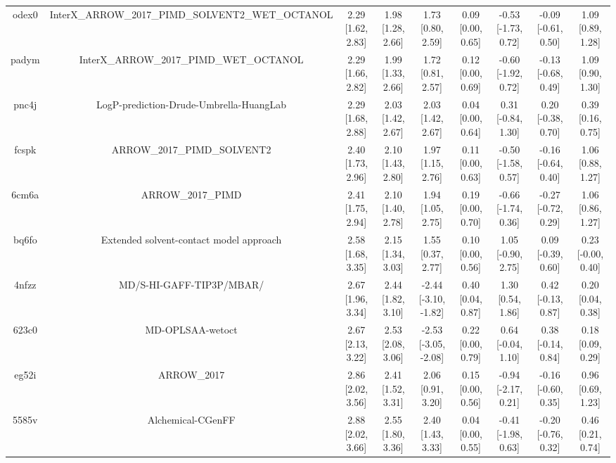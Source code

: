 \documentclass{article}
\begin{document}
\begin{center}
\begin{longtable}{|ccccccccc|}
 odex0 &  InterX\_ARROW\_2017\_PIMD\_SOLVENT2\_WET\_OCTANOL &  2.29 [1.62, 2.83] &  1.98 [1.28, 2.66] &     1.73 [0.80, 2.59] &  0.09 [0.00, 0.65] &  -0.53 [-1.73, 0.72] &  -0.09 [-0.61, 0.50] &     1.09 [0.89, 1.28] \\
 padym &            InterX\_ARROW\_2017\_PIMD\_WET\_OCTANOL &  2.29 [1.66, 2.82] &  1.99 [1.33, 2.66] &     1.72 [0.81, 2.57] &  0.12 [0.00, 0.69] &  -0.60 [-1.92, 0.72] &  -0.13 [-0.68, 0.49] &     1.09 [0.90, 1.30] \\
 pnc4j &            LogP-prediction-Drude-Umbrella-HuangLab &  2.29 [1.68, 2.88] &  2.03 [1.42, 2.67] &     2.03 [1.42, 2.67] &  0.04 [0.00, 0.64] &   0.31 [-0.84, 1.30] &   0.20 [-0.38, 0.70] &     0.39 [0.16, 0.75] \\
 fcspk &                        ARROW\_2017\_PIMD\_SOLVENT2 &  2.40 [1.73, 2.96] &  2.10 [1.43, 2.80] &     1.97 [1.15, 2.76] &  0.11 [0.00, 0.63] &  -0.50 [-1.58, 0.57] &  -0.16 [-0.64, 0.40] &     1.06 [0.88, 1.27] \\
 6cm6a &                                  ARROW\_2017\_PIMD &  2.41 [1.75, 2.94] &  2.10 [1.40, 2.78] &     1.94 [1.05, 2.75] &  0.19 [0.00, 0.70] &  -0.66 [-1.74, 0.36] &  -0.27 [-0.72, 0.29] &     1.06 [0.86, 1.27] \\
 bq6fo &            Extended solvent-contact model approach &  2.58 [1.68, 3.35] &  2.15 [1.34, 3.03] &     1.55 [0.37, 2.77] &  0.10 [0.00, 0.56] &   1.05 [-0.90, 2.75] &   0.09 [-0.39, 0.60] &    0.23 [-0.00, 0.40] \\
 4nfzz &                           MD/S-HI-GAFF-TIP3P/MBAR/ &  2.67 [1.96, 3.34] &  2.44 [1.82, 3.10] &  -2.44 [-3.10, -1.82] &  0.40 [0.04, 0.87] &    1.30 [0.54, 1.86] &   0.42 [-0.13, 0.87] &     0.20 [0.04, 0.38] \\
 623c0 &                                   MD-OPLSAA-wetoct &  2.67 [2.13, 3.22] &  2.53 [2.08, 3.06] &  -2.53 [-3.05, -2.08] &  0.22 [0.00, 0.79] &   0.64 [-0.04, 1.10] &   0.38 [-0.14, 0.84] &     0.18 [0.09, 0.29] \\
 eg52i &                                        ARROW\_2017 &  2.86 [2.02, 3.56] &  2.41 [1.52, 3.31] &     2.06 [0.91, 3.20] &  0.15 [0.00, 0.56] &  -0.94 [-2.17, 0.21] &  -0.16 [-0.60, 0.35] &     0.96 [0.69, 1.23] \\
 5585v &                                  Alchemical-CGenFF &  2.88 [2.02, 3.66] &  2.55 [1.80, 3.36] &     2.40 [1.43, 3.33] &  0.04 [0.00, 0.55] &  -0.41 [-1.98, 0.63] &  -0.20 [-0.76, 0.32] &     0.46 [0.21, 0.74] \\

\end{longtable}
\end{center}
\end{document}
